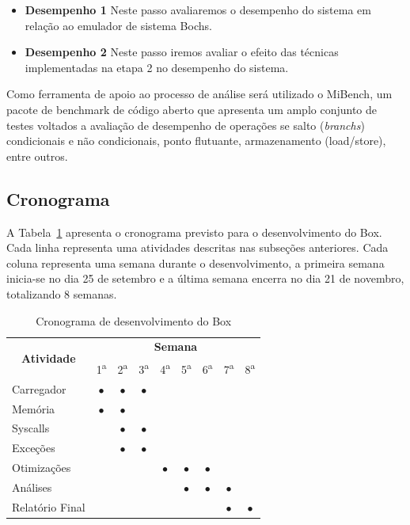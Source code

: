 \documentclass[11pt,twoside]{article}
\begin{document}
\begin{itemize}
 \item \textbf{Desempenho 1} Neste passo avaliaremos o desempenho do sistema em relação ao emulador de sistema Bochs.
 \item \textbf{Desempenho 2} Neste passo iremos avaliar o efeito das técnicas implementadas na etapa 2 no desempenho do sistema.
\end{itemize}

Como ferramenta de apoio ao processo de análise será utilizado o MiBench\cite{Guthaus2001}, um pacote de benchmark de código aberto que apresenta um amplo conjunto de testes voltados a avaliação de desempenho de operações se salto (\emph{branchs}) condicionais e não condicionais, ponto flutuante, armazenamento (load/store), entre outros.
 
\subsection{Cronograma}

A Tabela~\ref{tab:cronograma} apresenta o cronograma previsto para o desenvolvimento do Box.
Cada linha representa uma atividades descritas nas subseções anteriores. Cada coluna representa
uma semana durante o desenvolvimento, a primeira semana inicia-se no dia 25 de setembro e a
última semana encerra no dia 21 de novembro, totalizando 8 semanas.

\begin{table}[h]
\centering
\begin{tabular}{|l|c|c|c|c|c|c|c|c|} \hline
\multicolumn{1}{|c|}{\multirow{2}{*}{\textbf{Atividade}}} & \multicolumn{8}{c|}{\textbf{Semana}} \\ \cline{2-9}
\multicolumn{1}{|c|}{} & 1\textsuperscript{a} & 2\textsuperscript{a} & 3\textsuperscript{a} & 4\textsuperscript{a} & 5\textsuperscript{a} & 6\textsuperscript{a} & 7\textsuperscript{a} & 8\textsuperscript{a} \\ \hline
Carregador  	& $\bullet$ & $\bullet$ & $\bullet$ &  &  &  &  &  \\ \hline
Memória     	& $\bullet$ & $\bullet$ & &  &  &  &  &  \\ \hline
Syscalls    	&  & $\bullet$ & $\bullet$ &  &  &  &  &  \\ \hline
Exceções    	&  & $\bullet$ & $\bullet$ &  &  &  &  &  \\ \hline
Otimizações 	&  &  &  & $\bullet$ & $\bullet$ & $\bullet$ &  &  \\ \hline
Análises    	&  &  &  &  & $\bullet$ & $\bullet$ & $\bullet$ &  \\ \hline
Relatório Final	&  &  &  &  &  &  & $\bullet$ & $\bullet$ \\ \hline
\end{tabular}
\caption{Cronograma de desenvolvimento do Box}
\label{tab:cronograma}
\end{table}
\end{document}
